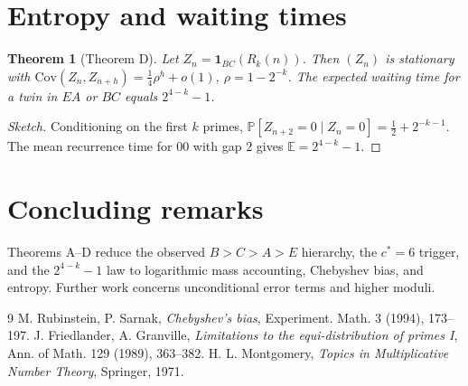 \documentclass{article}
\newtheorem{theorem}{Theorem}[section]
\theoremstyle{definition}
\newcommand{\Cov}{\mathrm{Cov}}
\newcommand{\one}{\mathbf{1}}
\begin{document}
	\section{Entropy and waiting times}
	
	\begin{theorem}[Theorem D]
		Let $Z_n=\one_{BC}(R_k(n))$. Then $(Z_n)$ is stationary with $\Cov(Z_n,Z_{n+h}) = \frac{1}{4}\rho^h+o(1)$, $\rho=1-2^{-k}$. The expected waiting time for a twin in $EA$ or $BC$ equals $2^{4-k}-1$.
	\end{theorem}
	
	\begin{proof}[Sketch]
		Conditioning on the first $k$ primes, $\mathbb{P}[Z_{n+2}=0\mid Z_n=0]=\frac{1}{2}+2^{-k-1}$. The mean recurrence time for $00$ with gap $2$ gives $\mathbb{E}=2^{4-k}-1$.
	\end{proof}
	
	\section{Concluding remarks}
	
	Theorems A–D reduce the observed $B>C>A>E$ hierarchy, the $c^*=6$ trigger, and the $2^{4-k}-1$ law to logarithmic mass accounting, Chebyshev bias, and entropy. Further work concerns unconditional error terms and higher moduli.
	
	\begin{thebibliography}{9}
		 M. Rubinstein, P. Sarnak, \emph{Chebyshev's bias}, Experiment. Math. 3 (1994), 173–197.
		 J. Friedlander, A. Granville, \emph{Limitations to the equi-distribution of primes I}, Ann. of Math. 129 (1989), 363–382.
		 H. L. Montgomery, \emph{Topics in Multiplicative Number Theory}, Springer, 1971.
	\end{thebibliography}
	
\end{document}
